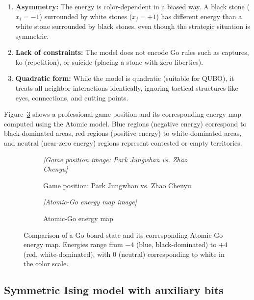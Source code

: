 \documentclass[aps,prl,reprint]{revtex4-2}
\begin{document}
\begin{enumerate}
	\item \textbf{Asymmetry:} The energy is color-dependent in a biased way. A black stone ($x_i = -1$) surrounded by white stones ($x_j = +1$) has different energy than a white stone surrounded by black stones, even though the strategic situation is symmetric.
	
	\item \textbf{Lack of constraints:} The model does not encode Go rules such as captures, ko (repetition), or suicide (placing a stone with zero liberties).
	
	\item \textbf{Quadratic form:} While the model is quadratic (suitable for QUBO), it treats all neighbor interactions identically, ignoring tactical structures like eyes, connections, and cutting points.
\end{enumerate}

Figure~\ref{fig:go_and_energy} shows a professional game position and its corresponding energy map computed using the Atomic model. Blue regions (negative energy) correspond to black-dominated areas, red regions (positive energy) to white-dominated areas, and neutral (near-zero energy) regions represent contested or empty territories.

\begin{figure}[h]
	\centering
	\begin{subfigure}[b]{0.45\textwidth}
		\centering
		\textit{[Game position image: Park Jungwhan vs. Zhao Chenyu]}
		\caption{Game position: Park Jungwhan vs. Zhao Chenyu}
		\label{fig:board}
	\end{subfigure}
	\hfill
	\begin{subfigure}[b]{0.45\textwidth}
		\centering
		\textit{[Atomic-Go energy map image]}
		\caption{Atomic-Go energy map}
		\label{fig:energy_map}
	\end{subfigure}
	\caption{Comparison of a Go board state and its corresponding Atomic-Go energy map. Energies range from $-4$ (blue, black-dominated) to $+4$ (red, white-dominated), with $0$ (neutral) corresponding to white in the color scale.}
	\label{fig:go_and_energy}
\end{figure}

\subsection{Symmetric Ising model with auxiliary bits}
\label{sec:symmetric_ising}
\end{document}
